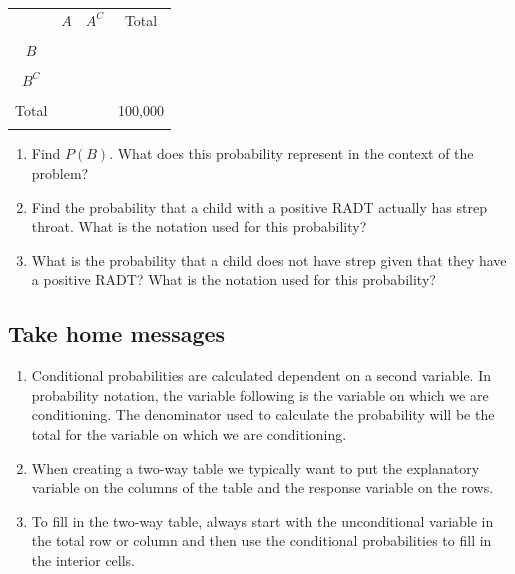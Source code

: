 \documentclass[
]{report}
\begin{document}
\begin{center}
\begin{tabular}{|c|c|c|c|} \hline
\hspace{0.8in} & \hspace{0.35in} $A$ \hspace{.35in} & \hspace{0.35in} $A^C$  \hspace{0.35in} & \hspace{0.3in} Total \hspace{0.3in} \\ 
& & & \\ \hline
$B$& & & \\ 
& & & \\ \hline
$B^C$& & & \\ 
& & & \\ \hline
Total & & & 100,000 \\ 
& & & \\ \hline
\end{tabular}
\end{center}
\vspace{.1in}

\begin{enumerate}
\def\labelenumi{\alph{enumi}.}
\setcounter{enumi}{2}
\item
  Find \(P(B)\). What does this probability represent in the context of the problem?
  \vspace{.8in}
\item
  Find the probability that a child with a positive RADT actually has strep throat. What is the notation used for this probability?
  \vspace{.8in}
\item
  What is the probability that a child does not have strep given that they have a positive RADT? What is the notation used for this probability?
\end{enumerate}

\vspace{0.8in}

\subsection{Take home messages}\label{take-home-messages-2}

\begin{enumerate}
\def\labelenumi{\arabic{enumi}.}
\item
  Conditional probabilities are calculated dependent on a second variable. In probability notation, the variable following \texttt{\textbar{}} is the variable on which we are conditioning. The denominator used to calculate the probability will be the total for the variable on which we are conditioning.
\item
  When creating a two-way table we typically want to put the explanatory variable on the columns of the table and the response variable on the rows.
\item
  To fill in the two-way table, always start with the unconditional variable in the total row or column and then use the conditional probabilities to fill in the interior cells.
\end{enumerate}
\end{document}
